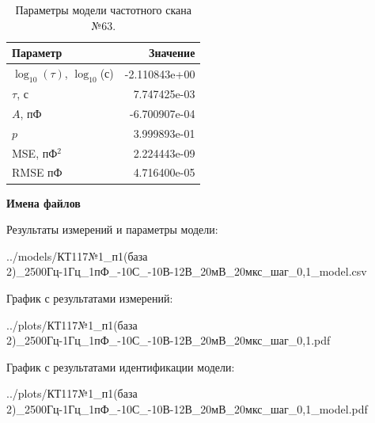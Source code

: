 \begin{table}[!ht]
    \centering
    \caption{Параметры модели частотного скана №63.}
    \begin{tabular}{|l|r|}
        \hline
        Параметр                                       & Значение                  \\ \hline
        $\log_{10}(\tau)$, $\log_{10}$(с)              & -2.110843e+00             \\ \hline
        $\tau$, с                                      & 7.747425e-03              \\ \hline
        $A$, пФ                                        & -6.700907e-04             \\ \hline
        $p$                                            & 3.999893e-01              \\ \hline
        MSE, пФ$^2$                                    & 2.224443e-09              \\ \hline
        RMSE пФ                                        & 4.716400e-05              \\ \hline
    \end{tabular}
    \label{table:frequency_scan_model_63}
\end{table}

\textbf{Имена файлов}

Результаты измерений и параметры модели:

\scriptsize../models/КТ117№1\_п1(база 2)\_2500Гц-1Гц\_1пФ\_-10С\_-10В-12В\_20мВ\_20мкс\_шаг\_0,1\_model.csv
\normalsize

График с результатами измерений:

\scriptsize../plots/КТ117№1\_п1(база 2)\_2500Гц-1Гц\_1пФ\_-10С\_-10В-12В\_20мВ\_20мкс\_шаг\_0,1.pdf
\normalsize

График с результатами идентификации модели:

\scriptsize../plots/КТ117№1\_п1(база 2)\_2500Гц-1Гц\_1пФ\_-10С\_-10В-12В\_20мВ\_20мкс\_шаг\_0,1\_model.pdf
\normalsize

